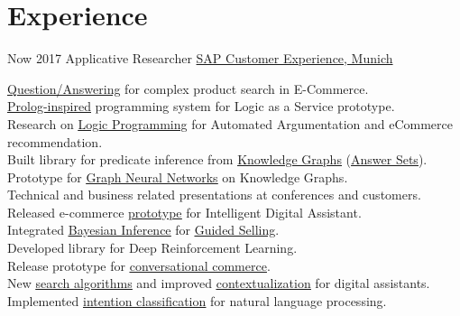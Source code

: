\documentclass[letterpaper]{twentysecondcv} %
\begin{document}
 \makeprofile %


\section{Experience}

\begin{twenty} %
\twentyitem
    	{Now}
		{2017}
        {Applicative Researcher}
        {\href{https://cxlabs.sap.com/}{SAP Customer Experience,  Munich}}
        {}
        {
        \href{https://blogs.sap.com/2022/07/14/question-answering-in-ecommerce-search/}{\underline{Question/Answering}} for complex product search in E-Commerce.\\
        \href{https://blogs.sap.com/2022/04/26/ludwig-experimental-programming-system-for-business-services/}{\underline{Prolog-inspired}} programming system for Logic as a Service prototype.\\
        Research on \href{https://blogs.sap.com/tag/logic-programming/}{\underline{Logic Programming}} for Automated Argumentation and eCommerce recommendation.\\
        Built library for predicate inference from \href{https://blogs.sap.com/tag/knowledge-graph/}{\underline{Knowledge Graphs}} (\href{https://blogs.sap.com/2020/11/25/rule-engines-and-knowledge-intensive-processing-with-answer-set-programming/}{\underline{Answer Sets}}).
        Prototype for \href{https://gfrison.com/2020/graph-convolution-networks}{\underline{Graph Neural Networks}} on Knowledge Graphs.\\
        Technical and business related presentations at conferences and customers.\\ 
        Released e-commerce \href{https://blogs.sap.com/tag/zefiro/}{\underline{prototype}} for Intelligent Digital Assistant.\\ 
        Integrated \href{https://github.com/sap/bayesian-network-builder}{\underline{Bayesian Inference}} for \href{https://blogs.sap.com/2020/09/22/bayesian-inference-for-guided-selling-sap-predictive-summit-talk/}{\underline{Guided Selling}}.\\
        Developed library for Deep Reinforcement Learning.\\
        Release prototype for \href{https://sapvideoa35699dc5.hana.ondemand.com/?entry_id=1_kp5hbyih}{\underline{conversational commerce}}.\\
        New \href{https://blogs.sap.com/2021/09/01/improve-conversational-commerce-search-with-knowledge-graphs/}{\underline{search algorithms}} and improved \href{https://gfrison.com/2018/03/14/stochastic-conversational-workflows/}{\underline{contextualization}}  for digital assistants. \\
        Implemented \href{https://gfrison.com/2017/09/01/deeplearning-in-text-classification/}{\underline{intention classification}} for natural language processing.
        
}
\end{twenty}
\end{document}
